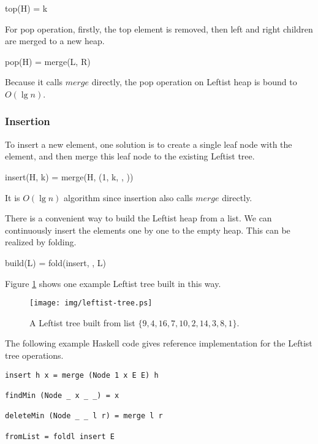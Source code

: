 \documentclass{article}
\begin{document}
\be
top(H) = k
\ee

For pop operation, firstly, the top element is removed, then
left and right children are merged to a new heap.

\be
pop(H) = merge(L, R)
\ee

Because it calls $merge$ directly, the pop operation on Leftist heap is bound
to $O(\lg n)$.

\subsubsection{Insertion}

To insert a new element, one solution is to create a single
leaf node with the element, and then merge this leaf node to
the existing Leftist tree.

\be
insert(H, k) = merge(H, (1, k, \Phi, \Phi))
\ee

It is $O(\lg n)$ algorithm since insertion also calls $merge$ directly.

There is a convenient way to build the Leftist heap from
a list. We can continuously insert the elements one by one
to the empty heap. This can be realized by folding.

\be
build(L) = fold(insert, \Phi, L)
\ee

Figure \ref{fig:leftist-tree} shows one example Leftist tree
built in this way.

\begin{figure}[htbp]
   \begin{center}
   	  \texttt{[image: img/leftist-tree.ps]}
    \caption{A Leftist tree built from list $\{9, 4, 16, 7, 10, 2, 14, 3, 8, 1\}$.}
    \label{fig:leftist-tree}
   \end{center}
\end{figure}

The following example Haskell code gives reference implementation
for the Leftist tree operations.

\lstset{language=Haskell}
\begin{lstlisting}
insert h x = merge (Node 1 x E E) h

findMin (Node _ x _ _) = x

deleteMin (Node _ _ l r) = merge l r

fromList = foldl insert E
\end{lstlisting}

\end{document}
